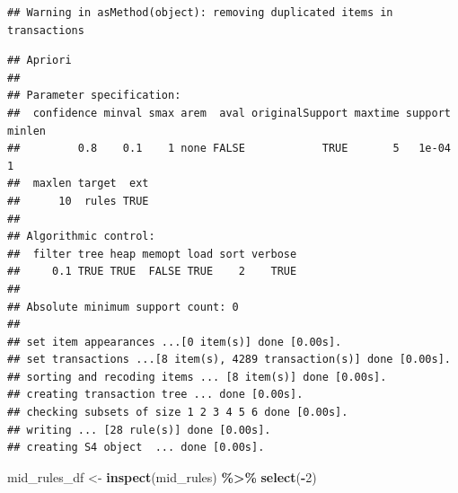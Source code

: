 \documentclass[
]{article}
\newenvironment{Shaded}{\begin{snugshade}}{\end{snugshade}}
\newcommand{\DecValTok}[1]{\textcolor[rgb]{0.00,0.00,0.81}{#1}}
\newcommand{\FunctionTok}[1]{\textcolor[rgb]{0.13,0.29,0.53}{\textbf{#1}}}
\newcommand{\NormalTok}[1]{#1}
\newcommand{\OtherTok}[1]{\textcolor[rgb]{0.56,0.35,0.01}{#1}}
\newcommand{\SpecialCharTok}[1]{\textcolor[rgb]{0.81,0.36,0.00}{\textbf{#1}}}
\begin{document}
\begin{verbatim}
## Warning in asMethod(object): removing duplicated items in transactions
\end{verbatim}

\begin{verbatim}
## Apriori
## 
## Parameter specification:
##  confidence minval smax arem  aval originalSupport maxtime support minlen
##         0.8    0.1    1 none FALSE            TRUE       5   1e-04      1
##  maxlen target  ext
##      10  rules TRUE
## 
## Algorithmic control:
##  filter tree heap memopt load sort verbose
##     0.1 TRUE TRUE  FALSE TRUE    2    TRUE
## 
## Absolute minimum support count: 0 
## 
## set item appearances ...[0 item(s)] done [0.00s].
## set transactions ...[8 item(s), 4289 transaction(s)] done [0.00s].
## sorting and recoding items ... [8 item(s)] done [0.00s].
## creating transaction tree ... done [0.00s].
## checking subsets of size 1 2 3 4 5 6 done [0.00s].
## writing ... [28 rule(s)] done [0.00s].
## creating S4 object  ... done [0.00s].
\end{verbatim}

\begin{Shaded}
\begin{Highlighting}[]
\NormalTok{mid\_rules\_df }\OtherTok{\textless{}{-}} \FunctionTok{inspect}\NormalTok{(mid\_rules) }\SpecialCharTok{\%\textgreater{}\%} \FunctionTok{select}\NormalTok{(}\SpecialCharTok{{-}}\DecValTok{2}\NormalTok{)}
\end{Highlighting}
\end{Shaded}
\end{document}
